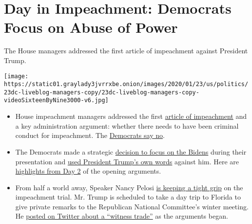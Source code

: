 \hypertarget{day-in-impeachment-democrats-focus-on-abuse-of-power}{%
\section{Day in Impeachment: Democrats Focus on Abuse of
Power}\label{day-in-impeachment-democrats-focus-on-abuse-of-power}}

The House managers addressed the first article of impeachment against
President Trump.

\texttt{[image: https://static01.graylady3jvrrxbe.onion/images/2020/01/23/us/politics/23dc-liveblog-managers-copy/23dc-liveblog-managers-copy-videoSixteenByNine3000-v6.jpg]}

\begin{itemize}
\item
  House impeachment managers addressed the first
  \href{https://www.nytimes3xbfgragh.onion/interactive/2019/12/10/us/politics/articles-impeachment-document-pdf.html}{article
  of impeachment} and a key administration argument: whether there needs
  to have been criminal conduct for impeachment. The
  \href{https://www.nytimes3xbfgragh.onion/live/2020/impeachment-trial-live-01-23/nadler-gives-a-history-lesson-in-arguing-that-no-crime-is-needed-for-impeachment\#live-blog-list}{Democrats
  say no}.
\item
  The Democrats made a strategic
  \href{https://www.nytimes3xbfgragh.onion/live/2020/impeachment-trial-live-01-23/democrats-make-a-strategic-decision-in-focusing-on-the-bidens-trumps-lawyer-sees-a-mistake\#live-blog-list}{decision
  to focus on the Bidens} during their presentation and
  \href{https://www.nytimes3xbfgragh.onion/live/2020/impeachment-trial-live-01-23/house-managers-trump-evidence}{used
  President Trump's own words} against him. Here are
  \href{https://www.nytimes3xbfgragh.onion/2020/01/23/us/politics/trump-impeachment-hearing-today.html}{highlights
  from Day 2} of the opening arguments.
\item
  From half a world away, Speaker Nancy Pelosi
  \href{https://www.nytimes3xbfgragh.onion/2020/01/23/us/politics/pelosi-trump-impeachment.html}{is
  keeping a tight grip} on the impeachment trial. Mr. Trump is scheduled
  to take a day trip to Florida to give private remarks to the
  Republican National Committee's winter meeting. He
  \href{https://www.nytimes3xbfgragh.onion/live/2020/impeachment-trial-live-01-23/is-president-trump-watching-the-trial\#live-blog-list}{posted
  on Twitter about a ``witness trade''} as the arguments began.
\end{itemize}

